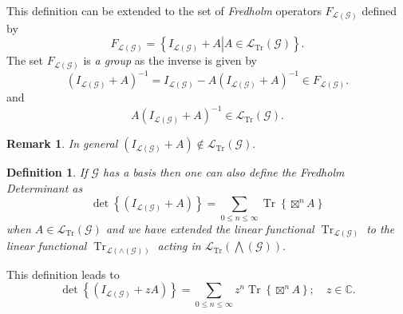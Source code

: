 \documentclass[aps,preprint]{revtex4}%
\newtheorem{definition}[theorem]{Definition}
\newtheorem{remark}[theorem]{Remark}
\begin{document}
This definition can be extended to the set of \emph{Fredholm} operators
$F_{\mathcal{L}\left(  \mathcal{G}\right)  }$ defined by
\begin{equation}
F_{\mathcal{L}\left(  \mathcal{G}\right)  }=\left\{  \left.  I_{\mathcal{L}%
\left(  \mathcal{G}\right)  }+A\right\vert A\in\mathcal{L}_{\operatorname{Tr}%
}\left(  \mathcal{G}\right)  \right\}  .
\end{equation}
The set $F_{\mathcal{L}\left(  \mathcal{G}\right)  }$ is \emph{a group} as the
inverse is given by%
\begin{equation}
\left(  I_{\mathcal{L}\left(  \mathcal{G}\right)  }+A\right)  ^{-1}%
=I_{\mathcal{L}\left(  \mathcal{G}\right)  }-A\left(  I_{\mathcal{L}\left(
\mathcal{G}\right)  }+A\right)  ^{-1}\in F_{\mathcal{L}\left(  \mathcal{G}%
\right)  }.
\end{equation}
and
\begin{equation}
A\left(  I_{\mathcal{L}\left(  \mathcal{G}\right)  }+A\right)  ^{-1}%
\in\mathcal{L}_{\operatorname{Tr}}\left(  \mathcal{G}\right)  .
\end{equation}


\begin{remark}
In general $\left(  I_{\mathcal{L}\left(  \mathcal{G}\right)  }+A\right)
\notin\mathcal{L}_{\operatorname{Tr}}\left(  \mathcal{G}\right)  .$
\end{remark}

\begin{definition}
If $\mathcal{G}$ has a basis then one can also define the \emph{Fredholm
Determinant} as
\begin{equation}
\det\left\{  \left(  I_{\mathcal{L}\left(  \mathcal{G}\right)  }+A\right)
\right\}  =%
{\textstyle\sum\limits_{0\leq n\leq\infty}}
\operatorname{Tr}\left\{  \boxtimes^{n}A\right\}
\end{equation}
when $A\in\mathcal{L}_{\operatorname{Tr}}\left(  \mathcal{G}\right)  $ and we
have extended the linear functional $\operatorname{Tr}_{\mathcal{L}\left(
\mathcal{G}\right)  }$ to the linear functional $\operatorname{Tr}%
_{\mathcal{L}\left(  \wedge\left(  \mathcal{G}\right)  \right)  }$ acting in
$\mathcal{L}_{\operatorname{Tr}}\left(  \bigwedge\left(  \mathcal{G}\right)
\right)  .$
\end{definition}

This definition leads to
\begin{equation}
\det\left\{  \left(  I_{\mathcal{L}\left(  \mathcal{G}\right)  }+zA\right)
\right\}  =%
{\textstyle\sum\limits_{0\leq n\leq\infty}}
z^{n}\operatorname{Tr}\left\{  \boxtimes^{n}A\right\}  ;\quad z\in\mathbb{C}.
\end{equation}
\end{document}
